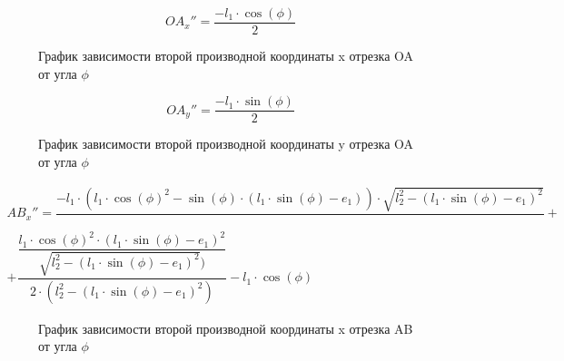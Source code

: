 \begin{equation}\label{eq:xOAdphi2}
	OA_x''=\dfrac{-l_1\cdot\cos(\phi)}{2}
\end{equation}

\begin{figure}[H]
	\centering
	\caption{График зависимости второй производной координаты x отрезка OA от угла $\phi$}
\end{figure}
\newpage
\begin{equation}\label{eq:yOAdphi2}
	OA_y''=\dfrac{-l_1\cdot\sin(\phi)}{2}
\end{equation}

\begin{figure}[H]
	\centering
	\caption{График зависимости второй производной координаты y отрезка OA от угла $\phi$}
\end{figure}
\newpage

\begin{eqnarray}\label{eq:xABdphi2}
	AB_x''= \dfrac{-l_1\cdot(l_1\cdot\cos(\phi)^2 - \sin(\phi)\cdot(l_1\cdot\sin(\phi) - e_1))\cdot \sqrt{
	l_2^2 - (l_1\cdot\sin(\phi) - e_1)^2}}{} + \nonumber \\ + \dfrac{\dfrac{l_1\cdot\cos(\phi)^2\cdot(l_1\cdot\sin(\phi) - e_1)^2}{\sqrt{
	l_2^2 - (l_1\cdot\sin(\phi) - e_1)^2})}} {2\cdot(l_2^2 - (l_1\cdot\sin(\phi) - e_1)^2)} - l_1\cdot\cos(\phi)
\end{eqnarray}

\begin{figure}[H]
	\centering
	\caption{График зависимости второй производной координаты x отрезка AB от угла $\phi$}
\end{figure}
\newpage	

